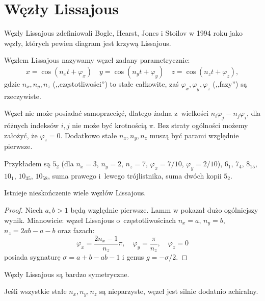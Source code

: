\section{Węzły Lissajous} %
\label{sec:lissajous}

Węzły Lissajous zdefiniowali Bogle, Hearst, Jones i Stoilov w 1994 roku jako węzły, których pewien diagram jest krzywą Lissajous.

\begin{definition}
    Węzłem Lissajous nazywamy węzeł zadany parametrycznie:
    \begin{equation}
        x = \cos(n_xt + \varphi_x) \quad
        y = \cos(n_yt + \varphi_y) \quad
        z = \cos(n_zt + \varphi_z),
    \end{equation}
    gdzie $n_x, n_y, n_z$ (,,częstotliwości'') to stałe całkowite, zaś $\varphi_x, \varphi_y, \varphi_z$ (,,fazy'') są rzeczywiste.
\end{definition}

Węzeł nie może posiadać samoprzecięć, dlatego żadna z~wielkości $n_i\varphi_j-n_j\varphi_i$, dla różnych indeksów $i, j$ nie może być krotnością $\pi$.
Bez straty ogólności możemy założyć, że $\varphi_z = 0$.
Dodatkowo stałe $n_x, n_y, n_z$ muszą być parami względnie pierwsze.

Przykładem są $5_2$ (dla $n_x = 3$, $n_y = 2$, $n_z = 7$, $\varphi_x = 7/10$, $\varphi_y = 2/10$), $6_1$, $7_4$, $8_{15}$, $10_1$, $10_{35}$, $10_{58}$, suma prawego i~lewego trójlistnika, suma dwóch kopii $5_2$.

\begin{proposition}
    Istnieje nieskończenie wiele węzłów Lissajous.
\end{proposition}

\begin{proof}
	Niech $a, b > 1$ będą względnie pierwsze.
	Lamm w \cite{lamm97} pokazał dużo ogólniejszy wynik.
	Mianowicie: węzeł Lissajous o~częstotliwościach $n_x = a$, $n_y = b$, $n_z = 2ab-a-b$ oraz fazach:
    \begin{equation}
        \varphi_x = \frac{2n_x-1}{n_z} \pi, \quad
        \varphi_y = \frac{\pi}{n_z}, \quad
        \varphi_z = 0
    \end{equation}
    posiada sygnaturę $\sigma = a+b-ab-1$ i genus $g = -\sigma/2$.
\end{proof}

Węzły Lissajous są bardzo symetryczne.

\begin{proposition}
    Jeśli wszystkie stałe $n_x, n_y, n_z$ są nieparzyste, węzeł jest silnie dodatnio achiralny.
\end{proposition}

